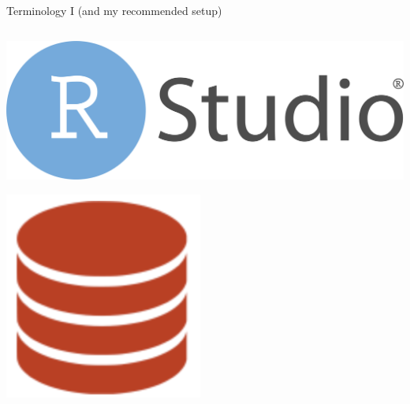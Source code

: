 \documentclass[ignorenonframetext, 10pt, aspectratio=169]{beamer}
\begin{document}
\begin{frame}{Terminology I (and my recommended setup)}
\begin{columns}[T]
\begin{column}{0.35\textwidth}
\bigskip
{}\includegraphics[width = 0.6\linewidth]{RStudio-Logo-Flat.png}

\bigskip
\bigskip
{}\includegraphics[width = 0.25\linewidth]{repo-0.png}
\end{column}
\end{columns}
\end{frame}
\end{document}
